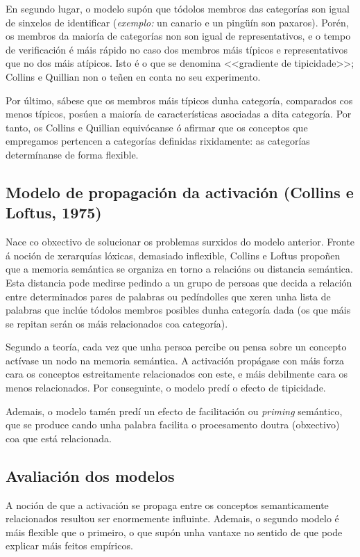 \documentclass[a4paper,11pt]{article}
\begin{document}
En segundo lugar, o modelo supón que tódolos membros das categorías son igual de sinxelos de identificar (\textit{exemplo:} un canario e un pingüín son paxaros). Porén, os membros da maioría de categorías non son igual de representativos, e o tempo de verificación é máis rápido no caso dos membros máis típicos e representativos que no dos máis atípicos. Isto é o que se denomina <<gradiente de tipicidade>>; Collins e Quillian non o teñen en conta no seu experimento.

Por último, sábese que os membros máis típicos dunha categoría, comparados cos menos típicos, posúen a maioría de características asociadas a dita categoría. Por tanto, os Collins e Quillian equivócanse ó afirmar que os conceptos que empregamos pertencen a categorías definidas rixidamente: as categorías determínanse de forma flexible.

\subsection{Modelo de propagación da activación (Collins e Loftus, 1975)}
Nace co obxectivo de solucionar os problemas surxidos do modelo anterior. Fronte á noción de xerarquías lóxicas, demasiado inflexible, Collins e Loftus propoñen que a memoria semántica se organiza en torno a relacións ou distancia semántica. Esta distancia pode medirse pedindo a un grupo de persoas que decida a relación entre determinados pares de palabras ou pedíndolles que xeren unha lista de palabras que inclúe tódolos membros posibles dunha categoría dada (os que máis se repitan serán os máis relacionados coa categoría).

Segundo a teoría, cada vez que unha persoa percibe ou pensa sobre un concepto actívase un nodo na memoria semántica. A activación propágase con máis forza cara os conceptos estreitamente relacionados con este, e máis debilmente cara os menos relacionados. Por conseguinte, o modelo predí o efecto de tipicidade.

Ademais, o modelo tamén predí un efecto de facilitación ou \textit{priming} semántico, que se produce cando unha palabra facilita o procesamento doutra (obxectivo) coa que está relacionada.

\subsection{Avaliación dos modelos}
A noción de que a activación se propaga entre os conceptos semanticamente relacionados resultou ser enormemente influinte. Ademais, o segundo modelo é máis flexible que o primeiro, o que supón unha vantaxe no sentido de que pode explicar máis feitos empíricos. 
\end{document}
